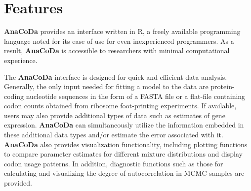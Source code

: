 \documentclass{bioinfo}
\newcommand{\package}{\textbf{AnaCoDa }} %
\begin{document}

\section*{Features}
\package provides an interface written in R, a freely available programming language noted for its ease of use for even inexperienced programmers. 
As a result, \package is accessible to researchers with minimal computational experience. 

The \package interface is designed for quick and efficient data analysis.
Generally, the only input needed for fitting a model to the data are protein-coding nucleotide sequences in the form of a FASTA file or a flat-file containing codon counts obtained from ribosome foot-printing experiments. 
If available, users may also provide additional types of data such as estimates of gene expression.
\package can simultaneously utilize the information embedded in these additional data types and/or estimate the error associated with it.
\package also provides visualization functionality, including plotting functions to compare parameter estimates for different mixture distributions and display codon usage patterns. In addition, diagnostic functions such as those for calculating and visualizing the degree of autocorrelation in MCMC samples are provided.
\end{document}
